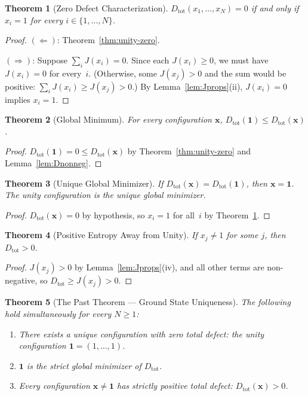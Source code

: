 \documentclass[12pt,a4paper]{article}
\newtheorem{theorem}{Theorem}[section]
\theoremstyle{definition}
\theoremstyle{remark}
\begin{document}
\begin{theorem}[Zero Defect Characterization]
\label{thm:zero-char}
$D_{\mathrm{tot}}(x_1, \ldots, x_N) = 0$ if and only if $x_i = 1$ for
every $i \in \{1, \ldots, N\}$.
\end{theorem}

\begin{proof}
$(\Leftarrow)$: Theorem~\ref{thm:unity-zero}.

$(\Rightarrow)$: Suppose $\sum_{i} J(x_i) = 0$.  Since each $J(x_i) \geq 0$,
we must have $J(x_i) = 0$ for every~$i$.  (Otherwise, some $J(x_j) > 0$
and the sum would be positive: $\sum_i J(x_i) \geq J(x_j) > 0$.)
By Lemma~\ref{lem:Jprops}(ii), $J(x_i) = 0$ implies $x_i = 1$.
\end{proof}

\begin{theorem}[Global Minimum]
\label{thm:global-min}
For every configuration $\mathbf{x}$,
$D_{\mathrm{tot}}(\mathbf{1}) \leq D_{\mathrm{tot}}(\mathbf{x})$.
\end{theorem}

\begin{proof}
$D_{\mathrm{tot}}(\mathbf{1}) = 0 \leq D_{\mathrm{tot}}(\mathbf{x})$
by Theorem~\ref{thm:unity-zero} and Lemma~\ref{lem:Dnonneg}.
\end{proof}

\begin{theorem}[Unique Global Minimizer]
\label{thm:unique-min}
If $D_{\mathrm{tot}}(\mathbf{x}) = D_{\mathrm{tot}}(\mathbf{1})$, then
$\mathbf{x} = \mathbf{1}$.  The unity configuration is the unique
global minimizer.
\end{theorem}

\begin{proof}
$D_{\mathrm{tot}}(\mathbf{x}) = 0$ by hypothesis, so $x_i = 1$ for
all~$i$ by Theorem~\ref{thm:zero-char}.
\end{proof}

\begin{theorem}[Positive Entropy Away from Unity]
\label{thm:pos-entropy}
If $x_j \neq 1$ for some $j$, then $D_{\mathrm{tot}} > 0$.
\end{theorem}

\begin{proof}
$J(x_j) > 0$ by Lemma~\ref{lem:Jprops}(iv), and all other terms are
non-negative, so $D_{\mathrm{tot}} \geq J(x_j) > 0$.
\end{proof}

\begin{theorem}[The Past Theorem --- Ground State Uniqueness]
\label{thm:past-theorem}
The following hold simultaneously for every $N \geq 1$:
\begin{enumerate}[label=(\roman*)]
  \item There exists a unique configuration with zero total defect: the
  unity configuration $\mathbf{1} = (1,\ldots,1)$.
  \item $\mathbf{1}$ is the strict global minimizer of $D_{\mathrm{tot}}$.
  \item Every configuration $\mathbf{x} \neq \mathbf{1}$ has strictly
  positive total defect: $D_{\mathrm{tot}}(\mathbf{x}) > 0$.
\end{enumerate}
\end{theorem}
\end{document}
